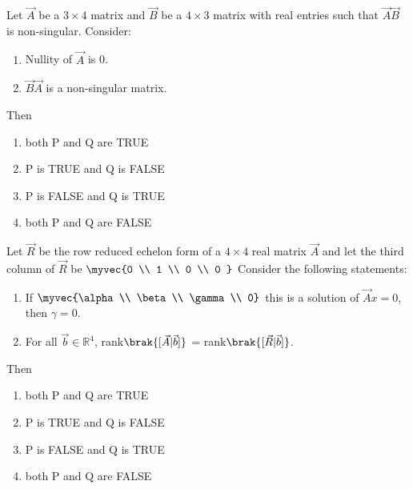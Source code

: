     \item Let $\vec{A}$ be a $3 \times 4$ matrix and $\vec{B}$ be a $4 \times 3$ matrix with real entries such that $\vec{A}\vec{B}$ is non-singular. Consider:
	    \begin{enumerate}[label=\Alph*:,start=16]
        \item  Nullity of $\vec{A}$ is 0.
        \item  $\vec{B}\vec{A}$ is a non-singular matrix.
    \end{enumerate}
    Then
    \begin{multicols}{2}
    \begin{enumerate}
        \item both P and Q are TRUE
        \item P is TRUE and Q is FALSE
        \item P is FALSE and Q is TRUE
        \item both P and Q are FALSE
    \end{enumerate}
\end{multicols}
\hfill{}
    \item Let $\vec{R}$ be the row reduced echelon form of a $4 \times 4$ real matrix $\vec{A}$ and let the third column of $\vec{R}$ be
    $
    \myvec{0 \\
    1 \\
    0 \\
    0
    }
    $
    Consider the following statements:
	    \begin{enumerate}[label=\Alph*:,start=16]
        \item  If $\myvec{\alpha \\ \beta \\ \gamma \\ 0}$ this is a solution of $\vec{A}x=0$, then $\gamma=0$.
        \item  For all $\vec{b} \in \mathbb{R}^4$, rank$\brak{[\vec{A}|\vec{b}]}$ = rank$\brak{[\vec{R}|\vec{b}]}$.
\end{enumerate}
    Then
    \hfill{}
    \begin{multicols}{2}
    \begin{enumerate}
        \item both P and Q are TRUE
        \item P is TRUE and Q is FALSE
        \item P is FALSE and Q is TRUE
        \item both P and Q are FALSE
    \end{enumerate}
\end{multicols}
